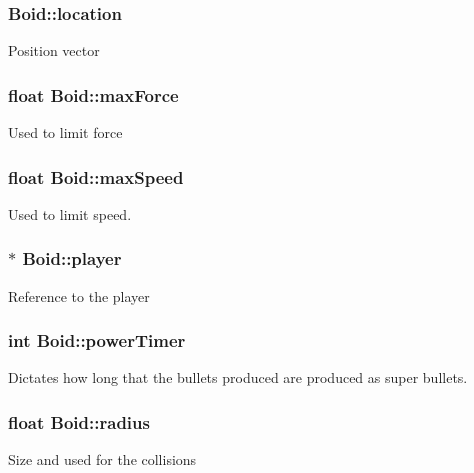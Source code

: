 \subsubsection[{\texorpdfstring{location}{location}}]{ Boid\+::location}\hypertarget{class_boid_a92a7f1ed6423149cd8a28426695d127e}{}\label{class_boid_a92a7f1ed6423149cd8a28426695d127e}
Position vector 
\subsubsection[{\texorpdfstring{max\+Force}{maxForce}}]{\setlength{\rightskip}{0pt plus 5cm}float Boid\+::max\+Force}\hypertarget{class_boid_a2a6d579118276efaeac7ba0e4b872afd}{}\label{class_boid_a2a6d579118276efaeac7ba0e4b872afd}
Used to limit force 
\subsubsection[{\texorpdfstring{max\+Speed}{maxSpeed}}]{\setlength{\rightskip}{0pt plus 5cm}float Boid\+::max\+Speed}\hypertarget{class_boid_ac57e1058fb698a542990405ecfd1d88b}{}\label{class_boid_ac57e1058fb698a542990405ecfd1d88b}
Used to limit speed. 
\subsubsection[{\texorpdfstring{player}{player}}]{$\ast$ Boid\+::player}\hypertarget{class_boid_ab5e134ab60644014edeff8d84a8187e6}{}\label{class_boid_ab5e134ab60644014edeff8d84a8187e6}
Reference to the player 
\subsubsection[{\texorpdfstring{power\+Timer}{powerTimer}}]{\setlength{\rightskip}{0pt plus 5cm}int Boid\+::power\+Timer}\hypertarget{class_boid_a33dde2d19ee395c259f90fe2b463b0b1}{}\label{class_boid_a33dde2d19ee395c259f90fe2b463b0b1}
Dictates how long that the bullets produced are produced as super bullets. 
\subsubsection[{\texorpdfstring{radius}{radius}}]{\setlength{\rightskip}{0pt plus 5cm}float Boid\+::radius}\hypertarget{class_boid_ac6f5c1abc120b30b0b24d78062e317cc}{}\label{class_boid_ac6f5c1abc120b30b0b24d78062e317cc}
Size and used for the collisions 
